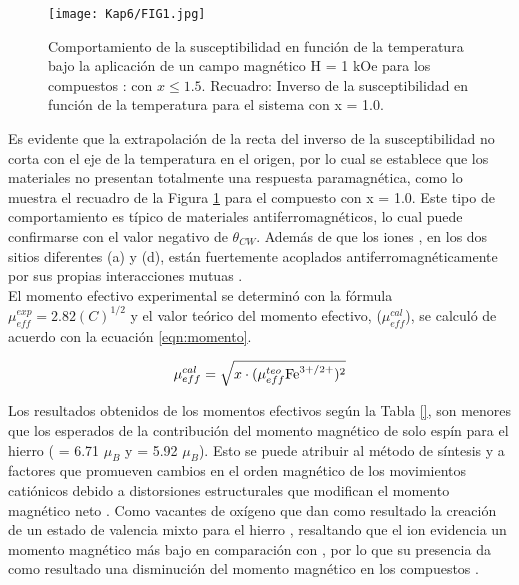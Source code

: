 
\begin{figure}[H]
    \centering%

    \texttt{[image: Kap6/FIG1.jpg]}%
    \caption{Comportamiento de la susceptibilidad en función de la temperatura
    bajo la aplicación de un campo magnético H = 1 kOe para los compuestos
    : con $x \leq 1.5$. Recuadro: Inverso
    de la susceptibilidad en función de la temperatura para el sistema con x = 1.0.
    }
    \label{fig:suce}
\end{figure}

Es evidente que la extrapolación de la recta del inverso de la susceptibilidad
no corta con el eje de la temperatura en el origen, por lo cual se establece
que los materiales no presentan totalmente una respuesta paramagnética, como lo
muestra el recuadro de la Figura \ref{fig:suce} para el compuesto con x = 1.0. Este
tipo de
comportamiento es típico de materiales antiferromagnéticos, lo cual puede
confirmarse con el valor negativo de $\theta_{CW}$. Además de que los iones
, en los
dos sitios diferentes (a) y (d), están fuertemente acoplados
antiferromagnéticamente por sus propias interacciones mutuas \cite{guillot1977magnetic}.\\

El momento efectivo experimental se determinó con la fórmula
$\mu_{eff}^{exp}=2.82(C)^{1/2}$ y el valor teórico del momento efectivo,
($\mu_{eff}^{cal}$), se calculó de acuerdo con la ecuación \ref{eqn:momento}.

\begin{equation}
    \mu_{eff}^{cal}=\sqrt{x\cdot (\mu_{eff}^{teo} \ce{Fe^{3+/2+}})^2}
    \label{eqn:momento}
\end{equation}

Los resultados obtenidos de los momentos efectivos según la Tabla \ref{}, son
menores que los esperados de la contribución del momento magnético de solo
espín para el hierro ( = 6.71 $\mu_{B}$ y  = 5.92
$\mu_B$). Esto se puede atribuir
al método de síntesis y a factores que promueven cambios en el orden magnético
de los movimientos catiónicos debido a distorsiones estructurales que modifican
el momento magnético neto \cite{banos2018enhancement}. Como vacantes de oxígeno que dan como
resultado
la creación de un estado de valencia mixto para el hierro ,
resaltando que el ion  evidencia un momento magnético más bajo en
comparación con , por lo que su presencia da como resultado una
disminución
del momento magnético en los compuestos \cite{hussain2019growth}.\\

